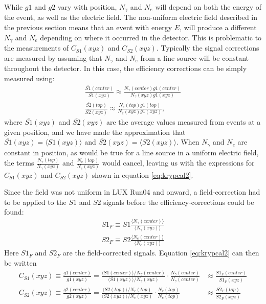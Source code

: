 While $g1$ and $g2$ vary with position, $N_{\gamma}$ and $N_e$ will depend on both the energy of the event, as well as the electric field. The non-uniform electric field described in the previous section means that an event with energy $E$, will produce a different $N_{\gamma}$ and $N_{e}$ depending on where it occurred in the detector. This is problematic to the measurements of $C_{S1}(xyz)$ and $C_{S2}(xyz)$. Typically the signal corrections are measured by assuming that $N_{\gamma}$ and $N_{e}$ from a line source will be constant throughout the detector. In this case, the efficiency corrections can be simply measured using:
\begin{equation}\label{eq:krypcal3}
\begin{split}
\frac{\overline{S1}(center)}{\overline{S1}(xyz)}\approx \frac{N_{\gamma}(center)g1(center)}{N_{\gamma}(xyz)g1(xyz)}\\[1em]
\frac{\overline{S2}(top)}{\overline{S2}(xyz)}\approx \frac{N_{e}(top)g1(top)}{N_{e}(xyz)g1(xyz)},
\end{split}
\end{equation}
where $\overline{S1}(xyz)$ and $\overline{S2}(xyz)$ are the average values measured from events at a given position, and we have made the approximation that $\overline{S1}(xyz)=\langle S1(xyz) \rangle$ and $\overline{S2}(xyz)=\langle S2(xyz) \rangle$. When $N_{\gamma}$ and $N_e$ are constant in position, as would be true for a line source in a uniform electric field, the terms $\frac{N_{\gamma}(top)}{N_{\gamma}(xyz)}$ and $\frac{N_{e}(top)}{N_{e}(xyz)}$ would cancel, leaving us with the expressions for $C_{S1}(xyz)$ and $C_{S2}(xyz)$ shown in equation \ref{eq:krypcal2}. 

Since the field was not uniform in LUX Run04 and onward, a field-correction had to be applied to the $S1$ and $S2$ signals before the efficiency-corrections could be found:
\begin{equation}\label{eq:krypcal4}
\begin{split}
S1_F\equiv S1 \frac{\langle N_{\gamma}(center) \rangle}{\langle N_{\gamma}(xyz)\rangle}\\[1em]
S2_F\equiv S2 \frac{\langle N_{e}(center)\rangle}{\langle N_{e}(xyz)\rangle}
\end{split}
\end{equation}
Here $S1_F$ and $S2_F$ are the field-corrected signals. Equation \ref{eq:krypcal2} can then be written
\begin{equation}\label{eq:krypcal5}
\begin{split}
C_{S1}(xyz) \equiv \frac{g1(center)}{g1(xyz)}=\frac{\langle S1(center) \rangle / N_{\gamma}(center)}{\langle S1(xyz) \rangle / N_{\gamma}(xyz)}\cdot \frac{N_{\gamma}(center)}{N_{\gamma}(center)} &\approx \frac{\overline{S1_F}(center)}{\overline{S1_F}(xyz)}\\[1em]
C_{S2}(xyz) \equiv \frac{g2(center)}{g2(xyz)}=\frac{\langle S2(top) \rangle / N_{e}(top)}{\langle S2(xyz) \rangle / N_{e}(xyz)} \cdot \frac{N_{e}(top)}{N_{e}(top)} &\approx \frac{\overline{S2_F}(top)}{\overline{S2_F}(xyz)}
\end{split}
\end{equation}

